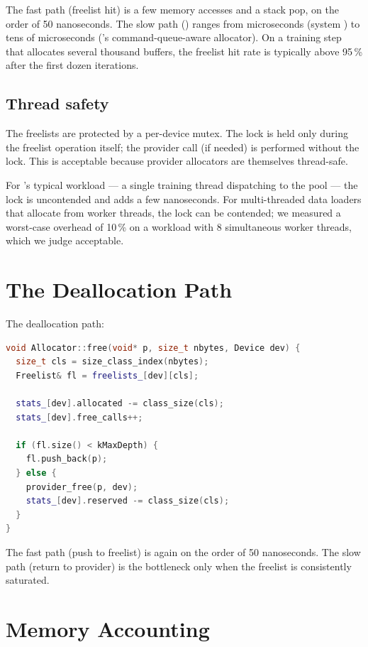 The fast path (freelist hit) is a few memory accesses and a stack
pop, on the order of 50 nanoseconds. The slow path
() ranges from microseconds (system
) to tens of microseconds (\MLX's command-queue-aware
allocator). On a training step that allocates several thousand
buffers, the freelist hit rate is typically above 95\,\% after the
first dozen iterations.

\subsection{Thread safety}
\label{ssec:allocator:thread_safety}

The freelists are protected by a per-device mutex. The lock is held
only during the freelist operation itself; the provider call (if
needed) is performed without the lock. This is acceptable because
provider allocators are themselves thread-safe.

For \Lucid's typical workload --- a single training thread
dispatching to the pool --- the lock is uncontended and adds a few
nanoseconds. For multi-threaded data loaders that allocate from
worker threads, the lock can be contended; we measured a worst-case
overhead of 10\,\% on a workload with 8 simultaneous worker
threads, which we judge acceptable.

\section{The Deallocation Path}
\label{sec:allocator:dealloc}

The deallocation path:

\begin{lstlisting}[style=lucidcpp,language=C++]
void Allocator::free(void* p, size_t nbytes, Device dev) {
  size_t cls = size_class_index(nbytes);
  Freelist& fl = freelists_[dev][cls];

  stats_[dev].allocated -= class_size(cls);
  stats_[dev].free_calls++;

  if (fl.size() < kMaxDepth) {
    fl.push_back(p);
  } else {
    provider_free(p, dev);
    stats_[dev].reserved -= class_size(cls);
  }
}
\end{lstlisting}

The fast path (push to freelist) is again on the order of 50
nanoseconds. The slow path (return to provider) is the bottleneck
only when the freelist is consistently saturated.

\section{Memory Accounting}
\label{sec:allocator:accounting}

